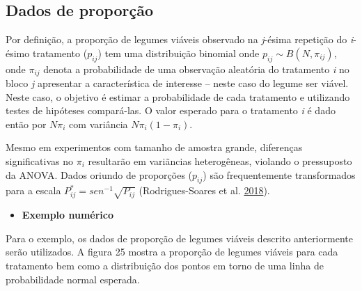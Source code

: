 \documentclass[
]{book}
\providecommand{\tightlist}{%
  \setlength{\itemsep}{0pt}\setlength{\parskip}{0pt}}
\numberwithin{equation}{section}
\begin{document}
\hypertarget{dados-de-proporuxe7uxe3o}{%
\subsection{Dados de proporção}\label{dados-de-proporuxe7uxe3o}}

Por definição, a proporção de legumes viáveis observado na \emph{j}-ésima repetição do \emph{i}-ésimo tratamento (\(p_{ij}\)) tem uma distribuição binomial onde \(p_{ij} \sim B(N, \pi_{ij})\), onde \(\pi_{ij}\) denota a probabilidade de uma observação aleatória do tratamento \emph{i} no bloco \emph{j} apresentar a característica de interesse -- neste caso do legume ser viável. Neste caso, o objetivo é estimar a probabilidade de cada tratamento e utilizando testes de hipóteses compará-las. O valor esperado para o tratamento \emph{i} é dado então por \(N\pi_i\) com variância \(N\pi_i(1-\pi_i)\).

Mesmo em experimentos com tamanho de amostra grande, diferenças significativas no \(\pi_i\) resultarão em variãncias heterogêneas, violando o pressuposto da ANOVA. Dados oriundo de proporções (\(p_{ij}\)) são frequentemente transformados para a escala \(P^*_{ij} = sen^{-1} \sqrt{P_{ij}}\) (Rodrigues-Soares et al. \protect\hyperlink{ref-Rodrigues-Soares2018}{2018}).

\begin{itemize}
\tightlist
\item
  \textbf{Exemplo numérico}
\end{itemize}

Para o exemplo, os dados de proporção de legumes viáveis descrito anteriormente serão utilizados. A figura 25 mostra a proporção de legumes viáveis para cada tratamento bem como a distribuição dos pontos em torno de uma linha de probabilidade normal esperada.
\end{document}
